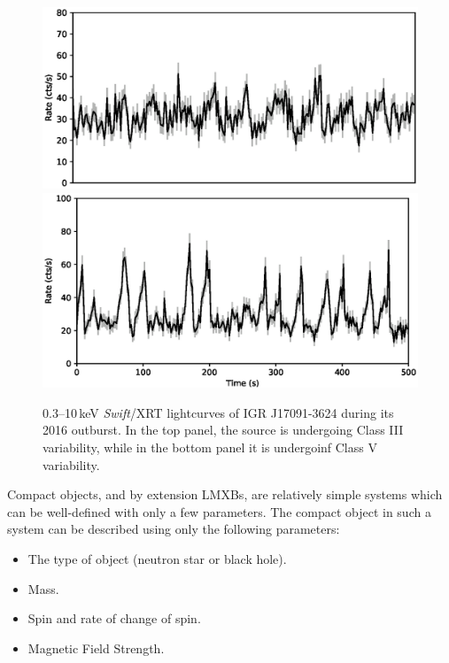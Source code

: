 \begin{figure}
  \centering
  \includegraphics[width=.9\linewidth, trim= 10mm 8mm 10mm 10mm,clip]{images/2016_III.eps}
  \includegraphics[width=.9\linewidth, trim= 10mm 0mm 10mm 10mm,clip]{images/2016_V.eps}
  \caption[\textit{Swift}/XRT lightcurves of IGR J17091-3624 during its 2016 outburst, showing two of the variability classes we identify in Chapter \ref{ch:IGR}.]{0.3--10\,keV \textit{Swift}/XRT lightcurves of IGR J17091-3624 during its 2016 outburst.  In the top panel, the source is undergoing Class III variability, while in the bottom panel it is undergoinf Class V variability.}
  \label{fig:IGR2016}
\end{figure}

\par Compact objects, and by extension LMXBs, are relatively simple systems which can be well-defined with only a few parameters.  The compact object in such a system can be described using only the following parameters:

\begin{itemize}
\item The type of object (neutron star or black hole).
\item Mass.
\item Spin and rate of change of spin.
\item Magnetic Field Strength.
\end{itemize}

